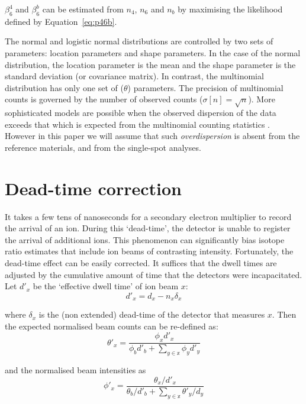 \documentclass{article}
\begin{document}
$\beta^{4}_{6}$ and $\beta^{b}_{6}$ can be estimated from $n_4$, $n_6$
and $n_b$ by maximising the likelihood defined by
Equation~\ref{eq:p46b}.\medskip

The normal and logistic normal distributions are controlled by two
sets of parameters: location parameters and shape parameters. In the
case of the normal distribution, the location parameter is the mean
and the shape parameter is the standard deviation (or covariance
matrix). In contrast, the multinomial distribution has only one set of
($\theta$) parameters.  The precision of multinomial counts is
governed by the number of observed counts ($\sigma[n] =
\sqrt{n}$). More sophisticated models are possible when the observed
dispersion of the data exceeds that which is expected from the
multinomial counting statistics
\citep[e.g.,][]{galbraith1993,vermeesch2018d}. However in this paper
we will assume that such \emph{overdispersion} is absent from the
reference materials, and from the single-spot analyses.

\section{Dead-time correction}
\label{sec:dead-time}

It takes a few tens of nanoseconds for a secondary electron multiplier
to record the arrival of an ion. During this `dead-time', the detector
is unable to register the arrival of additional ions. This phenomenon
can significantly bias isotope ratio estimates that include ion beams
of contrasting intensity. Fortunately, the dead-time effect can be
easily corrected.  It suffices that the dwell times are adjusted by
the cumulative amount of time that the detectors were incapacitated.
Let $d'_x$ be the `effective dwell time' of ion beam $x$:
\begin{equation}
  d'_x = d_x - n_x \delta_x
\end{equation}

\noindent where $\delta_x$ is the (non extended) dead-time of the detector
that measures $x$. Then the expected normalised beam counts can be
re-defined as:
\begin{equation}
  \theta'_{x} = \frac{\phi_{x}d'_{x}}
        {\phi_bd'_b + \sum_{y\in\mathbb{x}}\phi_{y}d'_y}
        \label{eq:thetax'}
\end{equation}

\noindent and the normalised beam intensities as
\begin{equation}
  \phi'_{x} = \frac{\theta_{x}/d'_{x}}
        {\theta_b/d'_b + \sum_{y\in\mathbb{x}}\theta'_{y}/d_y}
        \label{eq:phix'}
\end{equation}
\end{document}
